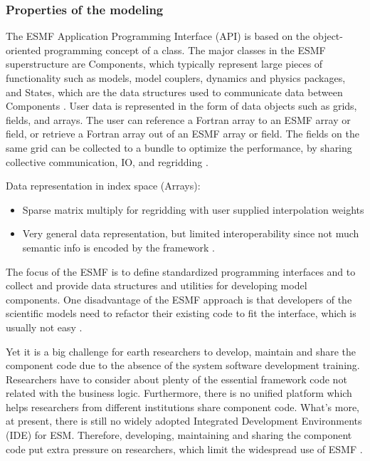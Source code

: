 \subsubsection {Properties of the modeling}
\par
The ESMF Application Programming Interface (API) is based on the object-oriented programming concept of a class. The major classes in the ESMF superstructure are Components, which typically represent large pieces of functionality such as models, model couplers, dynamics and physics packages, and States, which are the data structures used to communicate data between Components \autocite{dsl:esmf-overview}. User data is represented in the form of data objects such as grids, fields, and arrays. The user can reference a Fortran array to an ESMF array or field, or retrieve a Fortran array out of an ESMF array or field. The fields on the same grid can be collected to a bundle to optimize the performance, by sharing collective communication, IO, and regridding \autocite{dsl:esmf-tutorial2}.
\par
Data representation in index space (Arrays):
\begin{itemize}
	\item Sparse matrix multiply for regridding with user supplied interpolation weights
	\item Very general data representation, but limited interoperability since not much semantic info is encoded by the framework \autocite{dsl:esmf-enhancements}.
\end{itemize}
\par
The focus of the ESMF is to define standardized programming interfaces and to collect and provide data structures and utilities for developing model components. One disadvantage of the ESMF approach is that developers of the scientific models need to refactor their existing code to fit the interface, which is usually not easy \autocite{dsl:esmf-fortran}.
\par
Yet it is a big challenge for earth researchers to develop, maintain and share the component code due to the absence of the system software development training. Researchers have to consider about plenty of the essential framework code not related with the business logic. Furthermore, there is no unified platform which helps researchers from different institutions share component code. What’s more, at present, there is still no widely adopted Integrated Development Environments (IDE) for ESM. Therefore, developing, maintaining and sharing the component code put extra pressure on researchers, which limit the widespread use of ESMF \autocite{dsl:esmf-graphical}.
